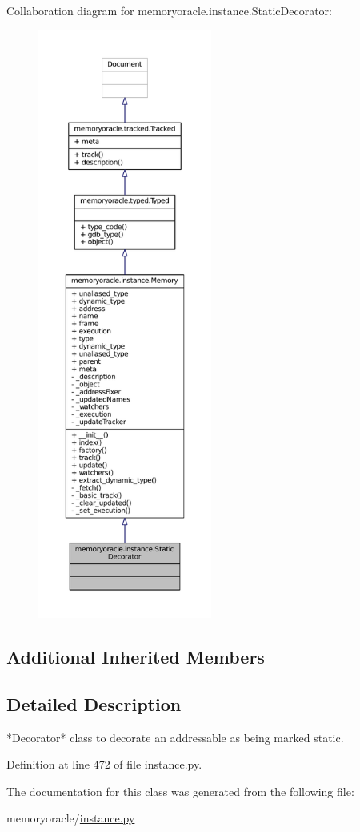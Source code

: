 Collaboration diagram for memoryoracle.\+instance.\+Static\+Decorator\+:
\nopagebreak
\begin{figure}[H]
\begin{center}
\leavevmode
\includegraphics[height=550pt]{classmemoryoracle_1_1instance_1_1StaticDecorator__coll__graph}
\end{center}
\end{figure}
\subsection*{Additional Inherited Members}


\subsection{Detailed Description}
\begin{DoxyVerb}*Decorator* class to decorate an addressable as being marked static.
\end{DoxyVerb}
 

Definition at line 472 of file instance.\+py.



The documentation for this class was generated from the following file\+:\begin{DoxyCompactItemize}
\item 
memoryoracle/\hyperlink{instance_8py}{instance.\+py}\end{DoxyCompactItemize}
